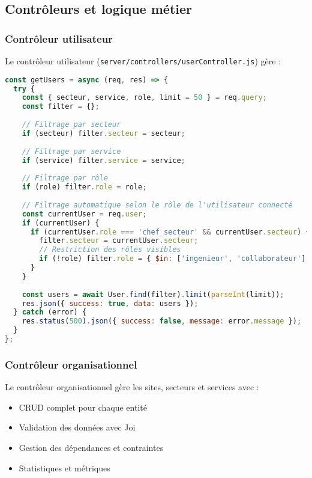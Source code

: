 \subsection{Contrôleurs et logique métier}
\subsubsection{Contrôleur utilisateur}
Le contrôleur utilisateur (\texttt{server/controllers/userController.js}) gère :

\begin{lstlisting}[language=JavaScript, caption=Fonction de récupération des utilisateurs]
const getUsers = async (req, res) => {
  try {
    const { secteur, service, role, limit = 50 } = req.query;
    const filter = {};
    
    // Filtrage par secteur
    if (secteur) filter.secteur = secteur;
    
    // Filtrage par service
    if (service) filter.service = service;
    
    // Filtrage par rôle
    if (role) filter.role = role;
    
    // Filtrage automatique selon le rôle de l'utilisateur connecté
    const currentUser = req.user;
    if (currentUser) {
      if (currentUser.role === 'chef_secteur' && currentUser.secteur) {
        filter.secteur = currentUser.secteur;
        // Restriction des rôles visibles
        if (!role) filter.role = { $in: ['ingenieur', 'collaborateur'] };
      }
    }
    
    const users = await User.find(filter).limit(parseInt(limit));
    res.json({ success: true, data: users });
  } catch (error) {
    res.status(500).json({ success: false, message: error.message });
  }
};
\end{lstlisting}

\subsubsection{Contrôleur organisationnel}
Le contrôleur organisationnel gère les sites, secteurs et services avec :
\begin{itemize}
    \item CRUD complet pour chaque entité
    \item Validation des données avec Joi
    \item Gestion des dépendances et contraintes
    \item Statistiques et métriques
\end{itemize}

